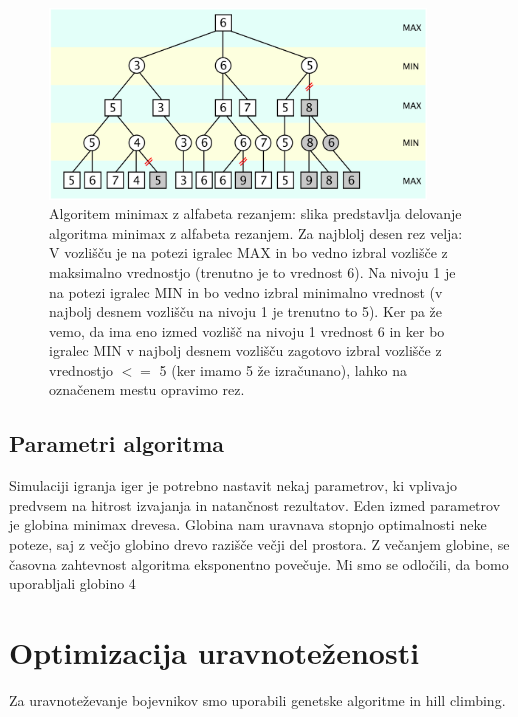 \documentclass[12pt,a4paper,openany]{book}
\begin{document}
\begin{figure}[ht]
 \centering
 \includegraphics[width=10cm]{alfabeta.png}
 \caption[Algoritem Minimax z alfabeta rezanjem.]{Algoritem minimax z alfabeta rezanjem: slika predstavlja delovanje algoritma minimax z alfabeta rezanjem. Za najblolj desen rez velja: V vozlišču je na potezi igralec MAX in bo vedno izbral vozlišče z maksimalno vrednostjo (trenutno je to vrednost 6). Na nivoju 1 je na potezi igralec MIN in bo vedno izbral minimalno vrednost (v najbolj desnem vozlišču na nivoju 1 je trenutno to 5). Ker pa že vemo, da ima eno izmed vozlišč na nivoju 1 vrednost 6 in ker bo igralec MIN v najbolj desnem vozlišču zagotovo izbral vozlišče z vrednostjo $<=$ 5 (ker imamo 5 že izračunano), lahko na označenem mestu opravimo rez.}
 \label{fig:alfabeta}
\end{figure}

\subsection{Parametri algoritma}
Simulaciji igranja iger je potrebno nastavit nekaj parametrov, ki vplivajo predvsem na hitrost izvajanja in natančnost rezultatov. Eden izmed parametrov je globina minimax drevesa. Globina nam uravnava stopnjo optimalnosti neke poteze, saj z večjo globino drevo razišče večji del prostora. Z večanjem globine, se časovna zahtevnost algoritma eksponentno povečuje. Mi smo se odločili, da bomo uporabljali globino 4

\section{Optimizacija uravnoteženosti}
Za uravnoteževanje bojevnikov smo uporabili genetske algoritme in hill climbing.
\end{document}
